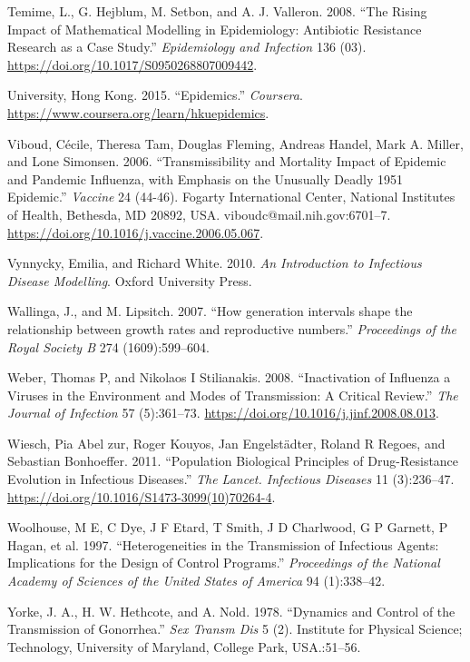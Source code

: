 \documentclass[]{book}
\theoremstyle{definition}
\theoremstyle{definition}
\theoremstyle{definition}
\theoremstyle{remark}
\begin{document}
\leavevmode\hypertarget{ref-temime08}{}%
Temime, L., G. Hejblum, M. Setbon, and A. J. Valleron. 2008. ``The
Rising Impact of Mathematical Modelling in Epidemiology: Antibiotic
Resistance Research as a Case Study.'' \emph{Epidemiology and Infection}
136 (03). \url{https://doi.org/10.1017/S0950268807009442}.

\leavevmode\hypertarget{ref-hkepidemics}{}%
University, Hong Kong. 2015. ``Epidemics.'' \emph{Coursera}.
\url{https://www.coursera.org/learn/hkuepidemics}.

\leavevmode\hypertarget{ref-viboud06}{}%
Viboud, Cécile, Theresa Tam, Douglas Fleming, Andreas Handel, Mark A.
Miller, and Lone Simonsen. 2006. ``Transmissibility and Mortality Impact
of Epidemic and Pandemic Influenza, with Emphasis on the Unusually
Deadly 1951 Epidemic.'' \emph{Vaccine} 24 (44-46). Fogarty International
Center, National Institutes of Health, Bethesda, MD 20892, USA.
viboudc@mail.nih.gov:6701--7.
\url{https://doi.org/10.1016/j.vaccine.2006.05.067}.

\leavevmode\hypertarget{ref-vynnycky10}{}%
Vynnycky, Emilia, and Richard White. 2010. \emph{An Introduction to
Infectious Disease Modelling}. Oxford University Press.

\leavevmode\hypertarget{ref-wallinga07}{}%
Wallinga, J., and M. Lipsitch. 2007. ``How generation intervals shape
the relationship between growth rates and reproductive numbers.''
\emph{Proceedings of the Royal Society B} 274 (1609):599--604.

\leavevmode\hypertarget{ref-weber08}{}%
Weber, Thomas P, and Nikolaos I Stilianakis. 2008. ``Inactivation of
Influenza a Viruses in the Environment and Modes of Transmission: A
Critical Review.'' \emph{The Journal of Infection} 57 (5):361--73.
\url{https://doi.org/10.1016/j.jinf.2008.08.013}.

\leavevmode\hypertarget{ref-wiesch11}{}%
Wiesch, Pia Abel zur, Roger Kouyos, Jan Engelstädter, Roland R Regoes,
and Sebastian Bonhoeffer. 2011. ``Population Biological Principles of
Drug-Resistance Evolution in Infectious Diseases.'' \emph{The Lancet.
Infectious Diseases} 11 (3):236--47.
\url{https://doi.org/10.1016/S1473-3099(10)70264-4}.

\leavevmode\hypertarget{ref-woolhouse97}{}%
Woolhouse, M E, C Dye, J F Etard, T Smith, J D Charlwood, G P Garnett, P
Hagan, et al. 1997. ``Heterogeneities in the Transmission of Infectious
Agents: Implications for the Design of Control Programs.''
\emph{Proceedings of the National Academy of Sciences of the United
States of America} 94 (1):338--42.

\leavevmode\hypertarget{ref-yorke78}{}%
Yorke, J. A., H. W. Hethcote, and A. Nold. 1978. ``Dynamics and Control
of the Transmission of Gonorrhea.'' \emph{Sex Transm Dis} 5 (2).
Institute for Physical Science; Technology, University of Maryland,
College Park, USA.:51--56.
\end{document}
